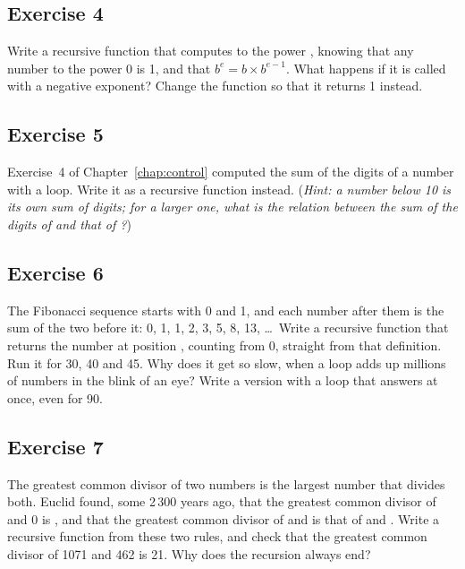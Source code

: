 \subsection*{Exercise 4}

Write a recursive function  that
computes  to the power , knowing that any number to
the power 0 is 1, and that $b^e = b \times b^{e - 1}$. What happens if it is
called with a negative exponent? Change the function so that it returns 1
instead.

\subsection*{Exercise 5}

Exercise~4 of Chapter~\ref{chap:control} computed the sum of the digits of a
number with a loop. Write it as a recursive function instead. (\textit{Hint: a
number below 10 is its own sum of digits; for a larger one, what is the relation
between the sum of the digits of  and that of ?})

\subsection*{Exercise 6}

The Fibonacci sequence starts with 0 and 1, and each number after them is the sum
of the two before it: 0, 1, 1, 2, 3, 5, 8, 13, \dots\ Write a recursive function
 that returns the number at position ,
counting from 0, straight from that definition. Run it for 30, 40 and 45. Why
does it get so slow, when a loop adds up millions of numbers in the blink of an
eye? Write a version with a loop that answers at once, even for 90.

\subsection*{Exercise 7}

The greatest common divisor of two numbers is the largest number that divides
both. Euclid found, some 2\,300 years ago, that the greatest common divisor of
 and 0 is , and that the greatest common divisor of 
and  is that of  and . Write a recursive function
 from these two rules, and check that the greatest common divisor of
1071 and 462 is 21. Why does the recursion always end?

